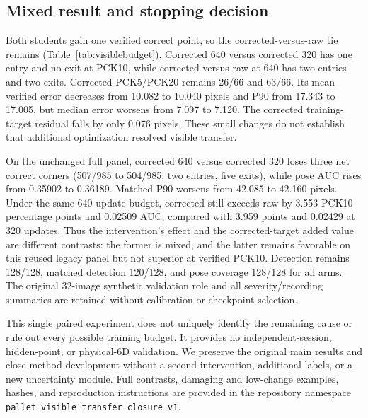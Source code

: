 \subsection{Mixed result and stopping decision}
Both students gain one verified correct point, so the corrected-versus-raw tie remains (Table~\ref{tab:visiblebudget}). Corrected 640 versus corrected 320 has one entry and no exit at PCK10, while corrected versus raw at 640 has two entries and two exits. Corrected PCK5/PCK20 remains 26/66 and 63/66. Its mean verified error decreases from 10.082 to 10.040 pixels and P90 from 17.343 to 17.005, but median error worsens from 7.097 to 7.120. The corrected training-target residual falls by only 0.076 pixels. These small changes do not establish that additional optimization resolved visible transfer.

On the unchanged full panel, corrected 640 versus corrected 320 loses three net correct corners (507/985 to 504/985; two entries, five exits), while pose AUC rises from 0.35902 to 0.36189. Matched P90 worsens from 42.085 to 42.160 pixels. Under the same 640-update budget, corrected still exceeds raw by 3.553 PCK10 percentage points and 0.02509 AUC, compared with 3.959 points and 0.02429 at 320 updates. Thus the intervention's effect and the corrected-target added value are different contrasts: the former is mixed, and the latter remains favorable on this reused legacy panel but not superior at verified PCK10. Detection remains 128/128, matched detection 120/128, and pose coverage 128/128 for all arms. The original 32-image synthetic validation role and all severity/recording summaries are retained without calibration or checkpoint selection.

This single paired experiment does not uniquely identify the remaining cause or rule out every possible training budget. It provides no independent-session, hidden-point, or physical-6D validation. We preserve the original main results and close method development without a second intervention, additional labels, or a new uncertainty module. Full contrasts, damaging and low-change examples, hashes, and reproduction instructions are provided in the repository namespace \texttt{pallet\_visible\_transfer\_closure\_v1}.
